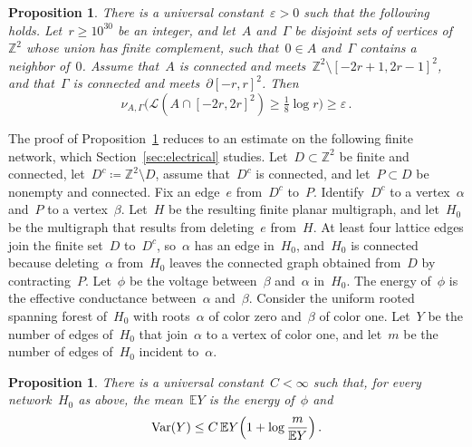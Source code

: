\documentclass[11pt]{amsart}
\numberwithin{equation}{section}
\newtheorem{proposition}[equation]{Proposition}
\newcommand{\Z}{\mathbb Z}
\newcommand{\EE}{\mathbb E}
\newcommand{\cL}{\mathscr{L}}
\begin{document}
\begin{proposition}\label{fo:local-comparison}
There is a universal constant~$\varepsilon>0$ such that the following holds. Let~$r\geq10^{30}$ be an integer, and let~$A$ and~$\Gamma$ be disjoint sets of vertices of~$\Z^2$ whose union has finite complement, such that~$0\in A$ and~$\Gamma$ contains a neighbor of~$0$. Assume that~$A$ is connected and meets~$\Z^2\setminus [-2r+1,2r-1]^2$, and that~$\Gamma$ is connected and meets~$\partial[-r,r]^2$. Then
\begin{equation*}
\nu_{A,\Gamma}\bigl(\cL(A\cap [-2r,2r]^2)\geq\tfrac18\log r\bigr)\geq\varepsilon\,.
\end{equation*}
\end{proposition}

The proof of Proposition~\ref{fo:local-comparison} reduces to an estimate on the following finite network, which Section~\ref{sec:electrical} studies. Let~$D\subset\Z^2$ be finite and connected, let~$D^c\coloneqq\Z^2\setminus D$, assume that~$D^c$ is connected, and let~$P\subset D$ be nonempty and connected. Fix an edge~$e$ from~$D^c$ to~$P$. Identify~$D^c$ to a vertex~$\alpha$ and~$P$ to a vertex~$\beta$. Let~$H$ be the resulting finite planar multigraph, and let~$H_0$ be the multigraph that results from deleting~$e$ from~$H$. At least four lattice edges join the finite set~$D$ to~$D^c$, so~$\alpha$ has an edge in~$H_0$, and~$H_0$ is connected because deleting~$\alpha$ from~$H_0$ leaves the connected graph obtained from~$D$ by contracting~$P$. Let~$\phi$ be the voltage between~$\beta$ and~$\alpha$ in~$H_0$. The energy of~$\phi$ is the effective conductance between~$\alpha$ and~$\beta$. Consider the uniform rooted spanning forest of~$H_0$ with roots~$\alpha$ of color zero and~$\beta$ of color one. Let~$Y$ be the number of edges of~$H_0$ that join~$\alpha$ to a vertex of color one, and let~$m$ be the number of edges of~$H_0$ incident to~$\alpha$.

\begin{proposition}\label{el:reference-moment}
There is a universal constant~$C<\infty$ such that, for every network~$H_0$ as above, the mean~$\EE Y$ is the energy of~$\phi$ and
\begin{equation}\label{el:reference-estimate}
\operatorname{Var}(Y)\leq C\,\EE Y\Bigl(1+\log\frac m{\EE Y}\Bigr)\,.
\end{equation}
\end{proposition}
\end{document}
